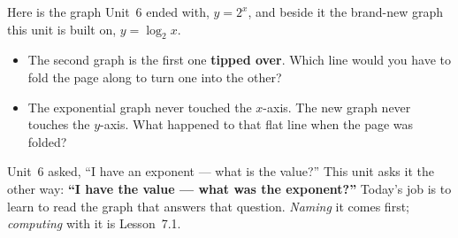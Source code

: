 \documentclass[10pt]{article}
\newcommand{\lgrid}[4]{%
  \draw[step=1, linegray!40, very thin] (#1,#3) grid (#2,#4);
  \draw[->, semithick, charcoal] (#1,0)--(#2,0) node[below right, font=\scriptsize]{$x$};
  \draw[->, semithick, charcoal] (0,#3)--(0,#4) node[left, font=\scriptsize]{$y$};}
\newcommand{\logcurve}[5]{\draw[very thick, forest, domain=#4:#5, samples=120, smooth]
  plot ({pow(#1,\x-(#3))+(#2)},{\x});}
\begin{document}
\begin{hookbox}
Here is the graph Unit~6 ended with, $y=2^x$, and beside it the brand-new graph this unit is built
on, $y=\log_2 x$.
\begin{center}
\end{center}
\begin{itemize}\setlength{\itemsep}{1pt}
  \item The second graph is the first one \textbf{tipped over}. Which line would you have to fold the page along to turn one into the other? \writeline
  \item The exponential graph never touched the $x$-axis. The new graph never touches the $y$-axis. What happened to that flat line when the page was folded? \writeline
\end{itemize}
Unit~6 asked, ``I have an exponent --- what is the value?'' This unit asks it the other way:
\textbf{``I have the value --- what was the exponent?''} Today's job is to learn to read the graph
that answers that question. \emph{Naming} it comes first; \emph{computing} with it is Lesson~7.1.
\end{hookbox}
\end{document}
